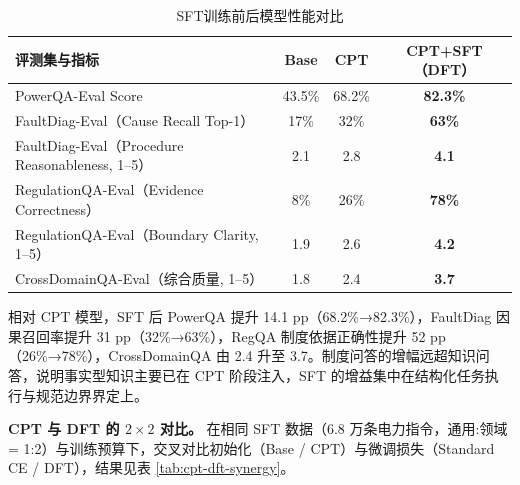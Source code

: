 \documentclass[fontset=fandol,type=master,campus=shenzhen,etitleauto=true]{hithesisbook}
\begin{document}
\begin{table}[htbp]
\centering
\caption{SFT训练前后模型性能对比}
\label{tab:sft-results}
\small
\begin{tabular}{l c c c}
\toprule
\textbf{评测集与指标} & \textbf{Base} & \textbf{CPT} & \textbf{CPT+SFT（DFT）} \\
\midrule
PowerQA-Eval Score & 43.5\% & 68.2\% & \textbf{82.3\%} \\
FaultDiag-Eval（Cause Recall Top-1） & 17\% & 32\% & \textbf{63\%} \\
FaultDiag-Eval（Procedure Reasonableness, 1--5） & 2.1 & 2.8 & \textbf{4.1} \\
RegulationQA-Eval（Evidence Correctness） & 8\% & 26\% & \textbf{78\%} \\
RegulationQA-Eval（Boundary Clarity, 1--5） & 1.9 & 2.6 & \textbf{4.2} \\
CrossDomainQA-Eval（综合质量, 1--5） & 1.8 & 2.4 & \textbf{3.7} \\
\bottomrule
\end{tabular}
\end{table}

相对 CPT 模型，SFT 后 PowerQA 提升 14.1 pp（68.2\%→82.3\%），FaultDiag 因果召回率提升 31 pp（32\%→63\%），RegQA 制度依据正确性提升 52 pp（26\%→78\%），CrossDomainQA 由 2.4 升至 3.7。制度问答的增幅远超知识问答，说明事实型知识主要已在 CPT 阶段注入，SFT 的增益集中在结构化任务执行与规范边界界定上。

\textbf{CPT 与 DFT 的 $2 \times 2$ 对比。} 在相同 SFT 数据（6.8 万条电力指令，通用:领域 = 1:2）与训练预算下，交叉对比初始化（Base / CPT）与微调损失（Standard CE / DFT），结果见表 \ref{tab:cpt-dft-synergy}。

\begin{table}[htbp]
\centering
\caption{初始化基座（Base vs.\ CPT）与微调目标（Standard CE vs.\ DFT）的 $2 \times 2$ 对比结果}
\label{tab:cpt-dft-synergy}
\small
\setlength{\tabcolsep}{4pt}
\renewcommand{\arraystretch}{1.15}
\end{table}
\end{document}
